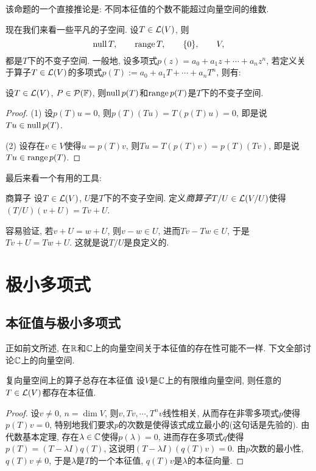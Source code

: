 该命题的一个直接推论是: 不同本征值的个数不能超过向量空间的维数. 

现在我们来看一些平凡的子空间. 设$T \in \mathcal{L} (V)$, 则$$\operatorname{null} T,\qquad \operatorname{range} T,\qquad \{ 0 \},\qquad V,$$
都是$T$下的不变子空间. 一般地, 设多项式$p(z)=a_0+a_1z+\cdots +a_nz^n$, 若定义关于算子$T \in \mathcal{L} (V)$的多项式$p(T):=a_0+a_1T+\cdots +a_nT^n$, 则有: 

\begin{proposition}{}
	设$T \in \mathcal{L} (V)$, $P \in \mathcal{P}(\mathbb{F})$, 则$\operatorname{null} p(T)$和$\operatorname{range} p(T)$是$T$下的不变子空间. 
\end{proposition}
\begin{proof}
	(1) 设$p(T)u=0$, 则$p(T)(Tu)=T(p(T)u)=0$, 即是说$Tu \in \operatorname{null} p(T)$. 
	
	(2) 设存在$v \in V$使得$u=p(T)v$, 则$Tu=T(p(T)v)=p(T)(Tv)$, 即是说$Tu \in \operatorname{range} p(T)$. 
\end{proof}

最后来看一个有用的工具: 

\begin{definition}{商算子}
	设$T \in \mathcal{L} (V)$, $U$是$T$下的不变子空间. 定义\textit{商算子}$T/U \in \mathcal{L} (V/U)$使得$(T/U)(v+U) = Tv+U$. 
\end{definition}

容易验证, 若$v+U=w+U$, 则$v-w\in U$, 进而$Tv-Tw \in U$, 于是$Tv+U=Tw+U$. 这就是说$T/U$是良定义的. 



\newpage
\section{极小多项式}

\subsection{本征值与极小多项式}

正如前文所述, 在$\mathbb{R}$和$\mathbb{C}$上的向量空间关于本征值的存在性可能不一样. 下文全部讨论$\mathbb{C}$上的向量空间. 

\begin{proposition}{复向量空间上的算子总存在本征值} \label{pro:bfvgvidecyzdxk}
	设$V$是$\mathbb{C}$上的有限维向量空间, 则任意的$T \in \mathcal{L} (V)$都存在本征值. 
\end{proposition}
\begin{proof}
	设$v \neq 0$, $n=\dim V$, 则$v,Tv,\cdots ,T^nv$线性相关, 从而存在非零多项式$p$使得$p(T)v=0$, 特别地我们要求$p$的次数是使得该式成立最小的(这句话是先验的). 由代数基本定理, 存在$\lambda \in \mathbb{C}$使得$p(\lambda)=0$, 进而存在多项式$q$使得$p(T)=(T-\lambda I)q(T)$, 这说明$(T-\lambda I)(q(T)v)=0$. 由$p$次数的最小性, $q(T)v \neq 0$, 于是$\lambda$是$T$的一个本征值, $q(T)v$是$\lambda$的本征向量. 
\end{proof}

